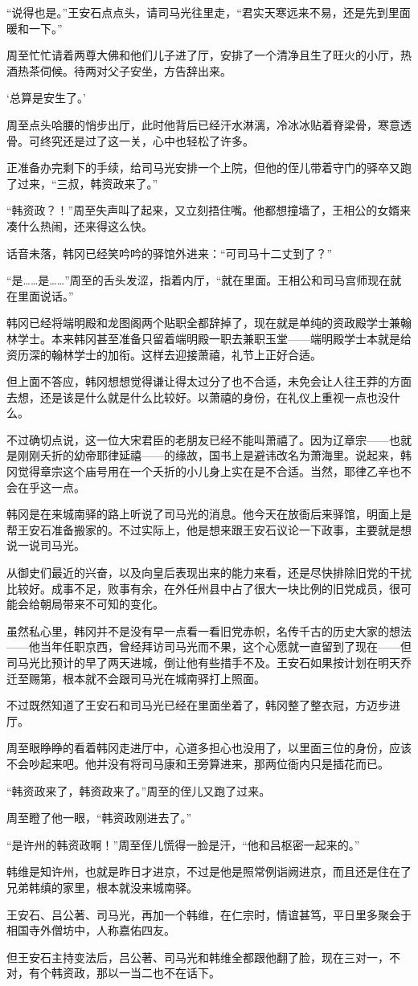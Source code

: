“说得也是。”王安石点点头，请司马光往里走，“君实天寒远来不易，还是先到里面暖和一下。”

周至忙忙请着两尊大佛和他们儿子进了厅，安排了一个清净且生了旺火的小厅，热酒热茶伺候。待两对父子安坐，方告辞出来。

‘总算是安生了。’

周至点头哈腰的悄步出厅，此时他背后已经汗水淋漓，冷冰冰贴着脊梁骨，寒意透骨。可终究还是过了这一关，心中也轻松了许多。

正准备办完剩下的手续，给司马光安排一个上院，但他的侄儿带着守门的驿卒又跑了过来，“三叔，韩资政来了。”

“韩资政？！”周至失声叫了起来，又立刻捂住嘴。他都想撞墙了，王相公的女婿来凑什么热闹，还来得这么快。

话音未落，韩冈已经笑吟吟的驿馆外进来：“可司马十二丈到了？”

“是……是……”周至的舌头发涩，指着内厅，“就在里面。王相公和司马宫师现在就在里面说话。”

韩冈已经将端明殿和龙图阁两个贴职全都辞掉了，现在就是单纯的资政殿学士兼翰林学士。本来韩冈甚至准备只留着端明殿一职去兼职玉堂——端明殿学士本就是给资历深的翰林学士的加衔。这样去迎接萧禧，礼节上正好合适。

但上面不答应，韩冈想想觉得谦让得太过分了也不合适，未免会让人往王莽的方面去想，还是该是什么就是什么比较好。以萧禧的身份，在礼仪上重视一点也没什么。

不过确切点说，这一位大宋君臣的老朋友已经不能叫萧禧了。因为辽章宗——也就是刚刚夭折的幼帝耶律延禧——的缘故，国书上是避讳改名为萧海里。说起来，韩冈觉得章宗这个庙号用在一个夭折的小儿身上实在是不合适。当然，耶律乙辛也不会在乎这一点。

韩冈是在来城南驿的路上听说了司马光的消息。他今天在放衙后来驿馆，明面上是帮王安石准备搬家的。不过实际上，他是想来跟王安石议论一下政事，主要就是想说一说司马光。

从御史们最近的兴奋，以及向皇后表现出来的能力来看，还是尽快排除旧党的干扰比较好。成事不足，败事有余，在外任州县中占了很大一块比例的旧党成员，很可能会给朝局带来不可知的变化。

虽然私心里，韩冈并不是没有早一点看一看旧党赤帜，名传千古的历史大家的想法——他当年任职京西，曾经拜访司马光而不果，这个心愿就一直留到了现在——但司马光比预计的早了两天进城，倒让他有些措手不及。王安石如果按计划在明天乔迁至赐第，根本就不会跟司马光在城南驿打上照面。

不过既然知道了王安石和司马光已经在里面坐着了，韩冈整了整衣冠，方迈步进厅。

周至眼睁睁的看着韩冈走进厅中，心道多担心也没用了，以里面三位的身份，应该不会吵起来吧。他并没有将司马康和王旁算进来，那两位衙内只是插花而已。

“韩资政来了，韩资政来了。”周至的侄儿又跑了过来。

周至瞪了他一眼，“韩资政刚进去了。”

“是许州的韩资政啊！”周至侄儿慌得一脸是汗，“他和吕枢密一起来的。”

韩维是知许州，也就是昨日才进京，不过是他是照常例诣阙进京，而且还是住在了兄弟韩缜的家里，根本就没来城南驿。

王安石、吕公著、司马光，再加一个韩维，在仁宗时，情谊甚笃，平日里多聚会于相国寺外僧坊中，人称嘉佑四友。

但王安石主持变法后，吕公著、司马光和韩维全都跟他翻了脸，现在三对一，不对，有个韩资政，那以一当二也不在话下。

